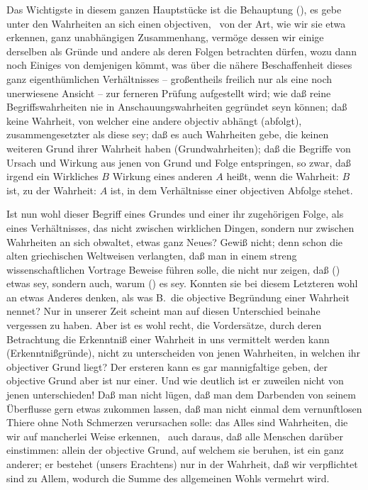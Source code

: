 \gliederungslinie\par
Das Wichtigste in diesem ganzen Hauptstücke ist die Behauptung (), es gebe unter den Wahrheiten an sich einen objectiven, \dh\  von der Art, wie wir sie etwa erkennen, ganz unabhängigen Zusammenhang, vermöge dessen wir einige derselben als Gründe und andere als deren Folgen betrachten dürfen, wozu dann noch Einiges von demjenigen kömmt, was  über die nähere Beschaffenheit dieses ganz eigenthümlichen Verhältnisses -- großentheils freilich nur als eine noch unerwiesene Ansicht -- zur ferneren Prüfung aufgestellt wird; wie daß reine Begriffswahrheiten nie in Anschauungswahrheiten gegründet seyn können; daß keine Wahrheit, von welcher eine andere objectiv abhängt (abfolgt), zusammengesetzter als diese sey; daß es auch Wahrheiten gebe, die keinen weiteren Grund ihrer Wahrheit haben (Grundwahrheiten); daß die Begriffe von Ursach und Wirkung aus jenen von Grund und Folge entspringen, so zwar, daß irgend ein Wirkliches $B$ Wirkung eines anderen $A$ heißt, wenn die Wahrheit: $B$ ist, zu der Wahrheit: $A$ ist, in dem Verhältnisse einer objectiven Abfolge stehet. \par
Ist nun wohl dieser Begriff eines Grundes und einer ihr zugehörigen Folge, als eines Verhältnisses, das nicht zwischen wirklichen Dingen, sondern nur zwischen Wahrheiten an sich obwaltet, etwas ganz Neues? Gewiß nicht; denn schon die alten griechischen Weltweisen verlangten, daß man in einem streng wissenschaftlichen Vortrage Beweise führen solle, die nicht nur zeigen, daß () etwas sey, sondern auch, warum () es sey. Konnten sie bei diesem Letzteren wohl an etwas Anderes denken, als was B.\ die objective Begründung einer Wahrheit nennet? Nur in unserer Zeit scheint man auf diesen Unterschied beinahe vergessen zu haben. Aber ist es wohl recht, die Vordersätze, durch deren Betrachtung die Erkenntniß einer Wahrheit in uns vermittelt werden kann (Erkenntnißgründe), nicht zu unterscheiden von jenen Wahrheiten, in welchen ihr objectiver Grund liegt? Der ersteren kann es gar mannigfaltige geben, der objective Grund aber ist nur einer. Und wie deutlich ist er zuweilen nicht von jenen unterschieden! Daß man nicht lügen, daß man dem Darbenden von seinem Überflusse gern etwas zukommen lassen, daß man nicht einmal dem vernunftlosen Thiere ohne Noth Schmerzen verursachen solle: das Alles sind Wahrheiten, die wir auf mancherlei Weise erkennen, \zB\ auch daraus, daß alle Menschen darüber einstimmen: allein der objective Grund, auf welchem sie beruhen, ist ein ganz anderer; er bestehet (unsers Erachtens) nur in der Wahrheit, daß wir verpflichtet sind zu Allem, wodurch die Summe des allgemeinen Wohls vermehrt wird. \par
